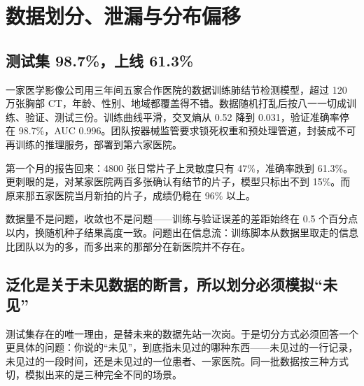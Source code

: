 \section{数据划分、泄漏与分布偏移}
\label{sec:13-Machine-Learning/01-Learning-Problems-and-Evaluation/04}

\subsection{测试集 98.7\%，上线 61.3\%}

一家医学影像公司用三年间五家合作医院的数据训练肺结节检测模型，超过 120 万张胸部 CT，年龄、性别、地域都覆盖得不错。数据随机打乱后按八一一切成训练、验证、测试三份。训练曲线平滑，交叉熵从 0.52 降到 0.031，验证准确率停在 98.7\%，AUC 0.996。团队按器械监管要求锁死权重和预处理管道，封装成不可再训练的推理服务，部署到第六家医院。

第一个月的报告回来：4800 张日常片子上灵敏度只有 47\%，准确率跌到 61.3\%。更刺眼的是，对某家医院两百多张确认有结节的片子，模型只标出不到 15\%。而原来那五家医院当月新拍的片子，成绩仍稳在 96\% 以上。

数据量不是问题，收敛也不是问题——训练与验证误差的差距始终在 0.5 个百分点以内，换随机种子结果高度一致。问题出在信息流：训练脚本从数据里取走的信息比团队以为的多，而多出来的那部分在新医院并不存在。

\subsection{泛化是关于未见数据的断言，所以划分必须模拟``未见''}

测试集存在的唯一理由，是替未来的数据先站一次岗。于是切分方式必须回答一个更具体的问题：你说的``未见''，到底指未见过的哪种东西——未见过的一行记录，未见过的一段时间，还是未见过的一位患者、一家医院。同一批数据按三种方式切，模拟出来的是三种完全不同的场景。

